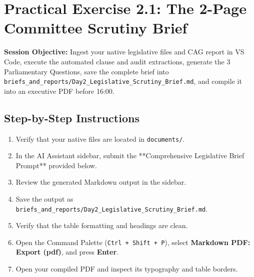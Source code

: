\documentclass[11pt, a4paper]{report}
\begin{document}
\section{Practical Exercise 2.1: The 2-Page Committee Scrutiny Brief}
\textbf{Session Objective:} Ingest your native legislative files and CAG report in VS Code, execute the automated clause and audit extractions, generate the 3 Parliamentary Questions, save the complete brief into \texttt{briefs\_and\_reports/Day2\_Legislative\_Scrutiny\_Brief.md}, and compile it into an executive PDF before 16:00.

\subsection{Step-by-Step Instructions}
\begin{enumerate}[label=\textbf{Step \arabic*:}]
    \item Verify that your native files are located in \texttt{documents/}.
    \item In the AI Assistant sidebar, submit the **Comprehensive Legislative Brief Prompt** provided below.
    \item Review the generated Markdown output in the sidebar.
    \item Save the output as \texttt{briefs\_and\_reports/Day2\_Legislative\_Scrutiny\_Brief.md}.
    \item Verify that the table formatting and headings are clean.
    \item Open the Command Palette (\texttt{Ctrl + Shift + P}), select \textbf{Markdown PDF: Export (pdf)}, and press \textbf{Enter}.
    \item Open your compiled PDF and inspect its typography and table borders.
\end{enumerate}
\end{document}
